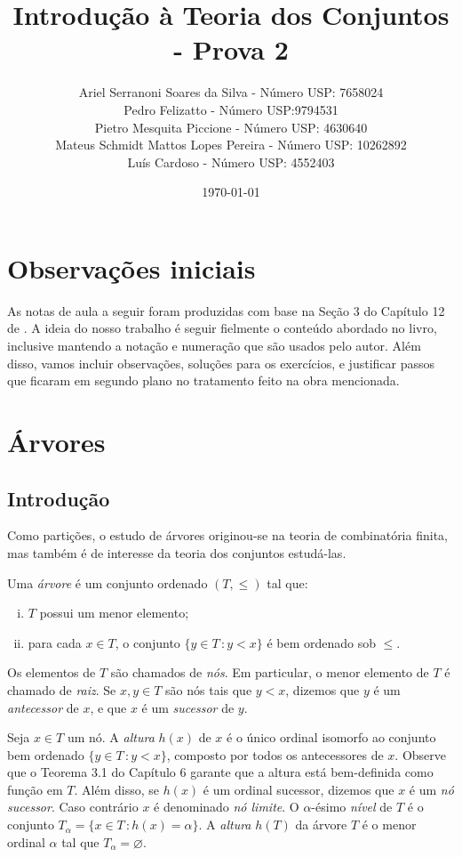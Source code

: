 \documentclass[a4paper]{article}
\title{Introdução à Teoria dos Conjuntos - Prova 2}
\author{Ariel Serranoni Soares da Silva  - Número USP: 7658024\\
Pedro Felizatto - Número USP:9794531\\
Pietro Mesquita Piccione - Número USP: 4630640\\
Mateus Schmidt Mattos Lopes Pereira - Número USP: 10262892\\
Luís Cardoso - Número USP: 4552403}
\date{\today}
\theoremstyle{plain}\newtheorem{teo}{Teorema}[section]
\theoremstyle{plain}\newtheorem{prop}[teo]{Proposição}
\theoremstyle{plain}\newtheorem{lem}[teo]{Lema}
\theoremstyle{plain}\newtheorem{cor}[teo]{Corolário}
\theoremstyle{definition}\newtheorem{defi}[teo]{Definição}
\theoremstyle{remark}\newtheorem{rem}[teo]{Observação}
\theoremstyle{definition}\newtheorem{example}[teo]{Exemplo}
\theoremstyle{remark}\newtheorem{step}{\bf Step}
\begin{document}
\maketitle
\section*{Observações iniciais}

As notas de aula a seguir foram produzidas com base na Seção 3 do Capítulo 12 de
\cite{jech}. A ideia do nosso trabalho é seguir fielmente o conteúdo abordado no
livro, inclusive mantendo a notação e numeração que são usados pelo autor.
Além disso, vamos incluir observações, soluções para os exercícios, e justificar
passos que ficaram em segundo plano no tratamento feito na obra mencionada.

\setcounter{section}{2}
\section{Árvores}
\subsection*{Introdução}
Como partições, o estudo de árvores originou-se na teoria de combinatória finita,
mas também é de interesse da teoria dos conjuntos estudá-las.
\begin{definition}
  Uma \emph{árvore} é um conjunto ordenado \((T,\leq)\) tal que:
 \begin{enumerate}[(i)]
  \item \(T\) possui um menor elemento;
  \item para cada \(x\in T\), o conjunto \(\{y\in T\,\colon y<x\}\) é bem
    ordenado sob \(\leq\).
  \end{enumerate}
\end{definition}
Os elementos de \(T\) são chamados de \emph{nós}. Em particular,
o menor elemento de \(T\) é chamado  de \emph{raiz}.
Se \(x,y\in T\) são nós tais que  \(y<x\), dizemos que \(y\) é um
\emph{antecessor} de \(x\), e que \(x\) é um \emph{sucessor} de \(y\).

Seja \(x\in T\) um nó.  A \emph{altura} \(h(x)\) de \(x\) é o único ordinal
isomorfo ao conjunto bem ordenado \mbox{\(\{y\in T\,\colon
y<x\}\),} composto por todos os antecessores de \(x\). Observe que o Teorema 3.1
do Capítulo 6 garante que a altura está bem-definida como função em \(T\).
Além disso, se \(h(x)\) é um ordinal sucessor, dizemos que \(x\) é um
\emph{nó sucessor}. Caso contrário \(x\) é denominado \emph{nó limite}.
O \(\alpha\)-ésimo \emph{nível} de \(T\) é o conjunto
\(T_\alpha=\{x\in T \,\colon h(x)=\alpha\}\). A \emph{altura} \(h(T)\) da árvore
\(T\) é o menor ordinal \(\alpha\) tal que \(T_\alpha=\varnothing\).  
\end{document}
